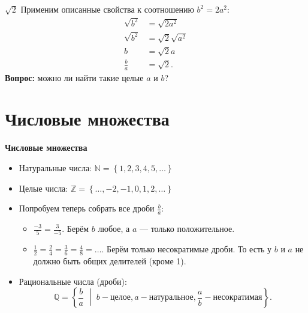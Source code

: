 \documentclass[11pt]{beamer}
\newcommand\fram[2]{\begin{frame}{\bf #1} #2 \end{frame}}
\newcommand{\set}[1]{\left\{ #1 \right\}}
\begin{document}
\fram{$\sqrt{2}$}{
Применим описанные свойства к соотношению $b^2 = 2a^2$:
\begin{align*}
    \sqrt{b^2} &= \sqrt{2a^2}\\
    \sqrt{b^2} &= \sqrt{2}\sqrt{a^2}\\
    b &= \sqrt{2}a\\
    \frac{b}{a} &= \sqrt{2}.
\end{align*}
\textbf{Вопрос:} можно ли найти такие целые $a$ и $b$?
}

\section{Числовые множества}
\fram{Числовые множества}{
\begin{itemize}
    \item Натуральные числа: $\mathbb{N} = \set{1, 2, 3, 4, 5, \ldots}$ \vspace{3mm}
    \item Целые числа: $\mathbb{Z} = \set{\ldots, -2, -1, 0, 1, 2, \ldots}$ \vspace{3mm}
    \item Попробуем теперь собрать все дроби $\frac{b}{a}$: \vspace{2mm}
    \begin{itemize}
        \item $\frac{-3}{5} = \frac{3}{-5}$. Берём $b$ любое, а $a$ --- только положительное. \vspace{2mm}
        \item $\frac{1}{2} = \frac{2}{4} = \frac{3}{6} = \frac{4}{8} = \ldots$.
        Берём только несократимые дроби. То есть у $b$ и $a$ не должно быть общих делителей (кроме 1). \vspace{1mm}
    \end{itemize}
    \item Рациональные числа (дроби): 
    $$\mathbb{Q} = \set{\frac{b}{a} \,\,\middle|\,\, b - \text{целое}, a - \text{натуральное}, \frac{a}{b} - \text{несократимая}}.$$
\end{itemize}
}
\end{document}
